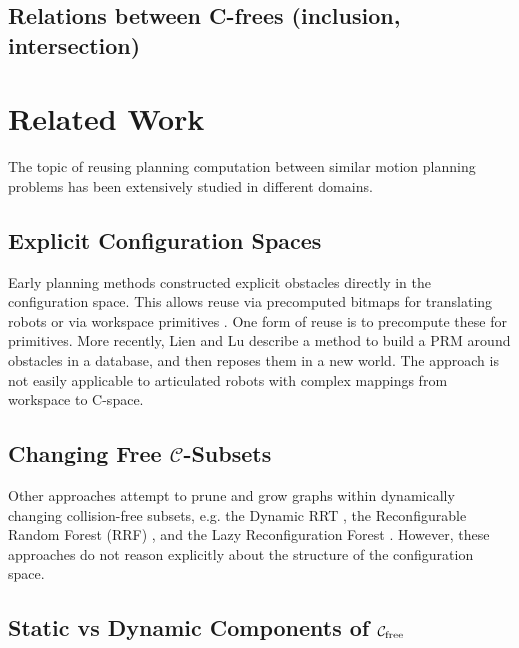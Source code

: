 \documentclass{report}
\begin{document}
\subsection{Relations between C-frees (inclusion, intersection)}

\section{Related Work}

The topic of reusing planning computation
between similar motion planning problems
has been extensively studied in different domains.

\subsection{Explicit Configuration Spaces}

Early planning methods constructed explicit obstacles
directly in the configuration space.
This allows reuse via precomputed bitmaps
for translating robots \cite{kavraki1995cspacefft}
or via workspace primitives \cite{newmanbranicky1991cspacetransforms}.
One form of reuse is to precompute these for primitives.
More recently,
Lien and Lu \cite{lien2009similarobstacles} describe a method to
build a PRM around obstacles in a database,
and then reposes them in a new world.
The approach is not easily applicable to articulated robots
with complex mappings from workspace to C-space.

\subsection{Changing Free $\mathcal{C}$-Subsets}

Other approaches attempt to prune and grow graphs
within dynamically changing collision-free subsets,
e.g. the Dynamic RRT \cite{ferguson2006drrt},
the Reconfigurable Random Forest (RRF)
\cite{li2002incrementalprmmanagement},
and the Lazy Reconfiguration Forest
\cite{gayle2007lazyreconfigforest}.
However, these approaches do not reason explicitly about the
structure of the configuration space.

\subsection{Static vs Dynamic Components of
   $\mathcal{C}_{\mbox{\scriptsize free}}$}
\end{document}
